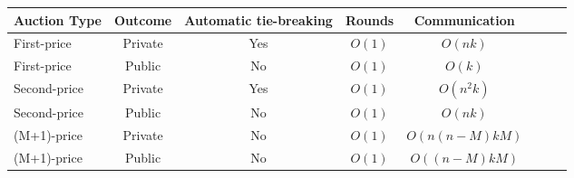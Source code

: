 \documentclass[a4paper,11pt]{article}
\begin{document}
\begin{center}
\begin{tabular}{l*{6}{c}r}
	Auction Type	& Outcome 	& Automatic tie-breaking 	& Rounds 	& Communication\\
	\hline
	First-price 	& Private	& Yes						& $O(1)$	& $O(nk)$\\
	First-price		& Public	& No						& $O(1)$	& $O(k)$\\
	Second-price	& Private	& Yes						& $O(1)$	& $O(n^2k)$\\
	Second-price    & Public	& No						& $O(1)$	& $O(nk)$\\
	(M+1)-price    	& Private	& No						& $O(1)$	& $O(n(n-M)kM)$\\
	(M+1)-price    	& Public	& No						& $O(1)$	& $O((n-M)kM)$\\
\end{tabular}
\end{center}
\end{document}
